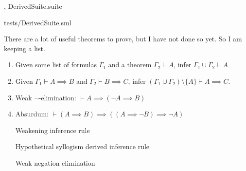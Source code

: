 \nwenddocs{}\endmoddef\nwstartdeflinemarkup\nwenddeflinemarkup
, DerivedSuite.suite
\nwendcode{}\nwdocspar

\nwenddocs{}\endmoddef\nwstartdeflinemarkup\nwenddeflinemarkup
tests/DerivedSuite.sml
\nwendcode{}\nwdocspar

\begin{node}\label{node:fs0:derived.nw:toc:propositional-logic}
There are a lot of useful theorems to prove, but I have not done so
yet. So I am keeping a list.
\begin{enumerate}\setcounter{enumi}{\value{node}}
\item Given some list of formulas $\Gamma_{1}$ and a theorem
  $\Gamma_{2}\vdash A$, infer $\Gamma_{1}\cup\Gamma_{2}\vdash A$
\item Given $\Gamma_{1}\vdash A\implies B$ and $\Gamma_{2}\vdash B\implies C$,
infer $(\Gamma_{1}\cup\Gamma_{2})\setminus\{A\}\vdash A\implies C$.
\item {} Weak $\neg$-elimination: $\vdash A\implies(\neg A\implies B)$
\item {} Absurdum: $\vdash(A\implies B)\implies((A\implies\neg B)\implies\neg A)$

\nwenddocs{}\endmoddef\nwstartdeflinemarkup{}\nwenddeflinemarkup
\LA{}Weakening inference rule~{\nwtagstyle{}}\RA{}

\LA{}Hypothetical syllogism derived inference rule~{\nwtagstyle{}}\RA{}

\LA{}Weak negation elimination~{\nwtagstyle{}}\RA{}


\end{enumerate}
\end{node}
